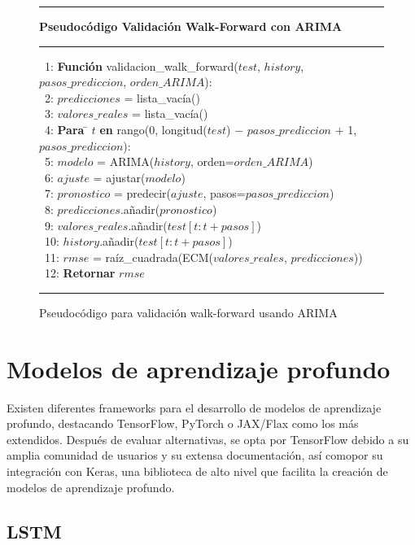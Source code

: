 \begin{figure}[H]
{\small
\hrule
{\bf\small Pseudocódigo Validación Walk-Forward con ARIMA}
\hrule
\begin{center}
\begin{tabbing}
\ 1: {\bf Fun}\={\bf ción} validacion\_walk\_forward($test$, $history$, $pasos\_prediccion$, $orden\_ARIMA$): \\
\ 2: \> $predicciones$ = lista\_vacía() \\
\ 3: \> $valores\_reales$ = lista\_vacía() \\
\ 4: \> {\bf Para} \= $t$ {\bf en} rango(0, longitud($test$) $-$ $pasos\_prediccion$ $+$ 1, $pasos\_prediccion$): \\
\ 5: \> \> $modelo$ = ARIMA($history$, orden=$orden\_ARIMA$) \\
\ 6: \> \> $ajuste$ = ajustar($modelo$) \\
\ 7: \> \> $pronostico$ = predecir($ajuste$, pasos=$pasos\_prediccion$) \\
\ 8: \> \> $predicciones$.añadir($pronostico$) \\
\ 9: \> \> $valores\_reales$.añadir($test[t : t+pasos]$) \\
\ 10: \> \> $history$.añadir($test[t : t+pasos]$) \\
\ 11: \> $rmse$ = raíz\_cuadrada(ECM($valores\_reales$, $predicciones$)) \\
\ 12: \> {\bf Retornar} $rmse$ \\
\end{tabbing}
\end{center}
}
\hrule
\caption{Pseudocódigo para validación walk-forward usando ARIMA}
\label{walk_forward_arima}
\end{figure}

\section{Modelos de aprendizaje profundo}
Existen diferentes frameworks para el desarrollo de modelos de aprendizaje profundo, destacando TensorFlow, PyTorch o JAX/Flax como los más extendidos.
Después de evaluar alternativas, se opta por TensorFlow debido a su amplia comunidad de usuarios y su extensa documentación, así comopor su integración con Keras, 
una biblioteca de alto nivel que facilita la creación de modelos de aprendizaje profundo.

\subsection{LSTM}

